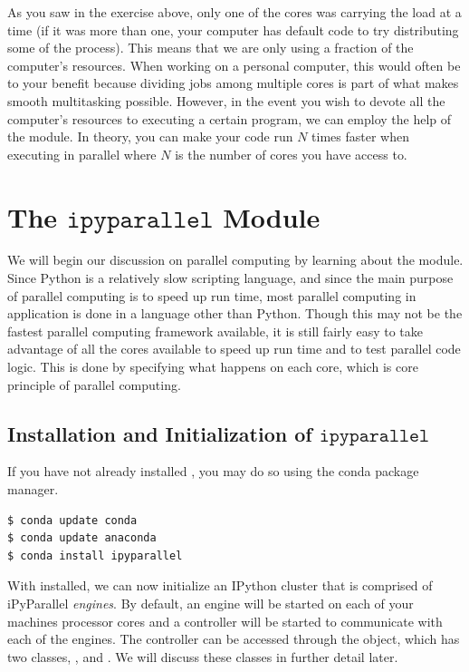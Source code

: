 As you saw in the exercise above, only one of the cores was carrying the load at a time (if it was more than one, your computer has default code to try distributing some of the process).
This means that we are only using a fraction of the computer's resources.
When working on a personal computer, this would often be to your benefit because dividing jobs among multiple cores is part of what makes smooth multitasking possible.
However, in the event you wish to devote all the computer's resources to executing a certain program, we can employ the help of the  module.
In theory, you can make your code run $N$ times faster when executing in parallel where $N$ is the number of cores you have access to.

\section*{The $\texttt{ipyparallel}$ Module}
We will begin our discussion on parallel computing by learning about the  module. 
Since Python is a relatively slow scripting language, and since the main purpose of parallel computing is to speed up run time, most parallel computing in application is done in a language other than Python.
Though this may not be the fastest parallel computing framework available, it is still fairly easy to take advantage of all the cores available to speed up run time and to test parallel code logic.
This is done by specifying what happens on each core, which is core principle of parallel computing.

\subsection*{Installation and Initialization of $\texttt{ipyparallel}$}

If you have not already installed , you may do so using the conda package manager.

\begin{lstlisting}
$ conda update conda
$ conda update anaconda
$ conda install ipyparallel
\end{lstlisting}

With  installed, we can now initialize an IPython cluster that is comprised of iPyParallel \emph{engines}.
By default, an engine will be started on each of your machines processor cores and a controller will be started to communicate with each of the engines.
The controller can be accessed through the  object, which has two classes, , and .
We will discuss these classes in further detail later.


